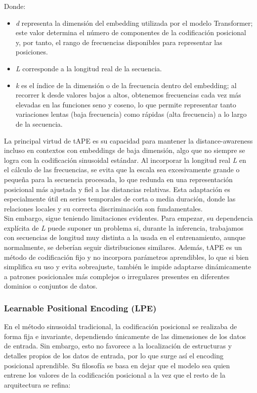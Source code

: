 Donde:

\begin{itemize}
	\item \textit{d} representa la dimensión del embedding utilizada por el modelo Transformer; este valor determina el número de componentes de la codificación posicional y, por tanto, el rango de frecuencias disponibles para representar las posiciones.
	\item \textit{L} corresponde a la longitud real de la secuencia.
	\item \textit{k} es el índice de la dimensión o de la frecuencia dentro del embedding; al recorrer k desde valores bajos a altos, obtenemos frecuencias cada vez más elevadas en las funciones seno y coseno, lo que permite representar tanto variaciones lentas (baja frecuencia) como rápidas (alta frecuencia) a lo largo de la secuencia.
\end{itemize} 

La principal virtud de tAPE es su capacidad para mantener la distance-awareness incluso en contextos con embeddings de baja dimensión, algo que no siempre se logra con la codificación sinusoidal estándar. Al incorporar la longitud real \textit{L} en el cálculo de las frecuencias, se evita que la escala sea excesivamente grande o pequeña para la secuencia procesada, lo que redunda en una representación posicional más ajustada y fiel a las distancias relativas. Esta adaptación es especialmente útil en series temporales de corta o media duración, donde las relaciones locales y su correcta discriminación son fundamentales.\\

Sin embargo, sigue teniendo limitaciones evidentes. Para empezar, su dependencia explícita de \textit{L} puede suponer un problema si, durante la inferencia, trabajamos con secuencias de longitud muy distinta a la usada en el entrenamiento, aunque normalmente, se deberían seguir distribuciones similares. Además, tAPE es un método de codificación fijo y no incorpora parámetros aprendibles, lo que si bien simplifica su uso y evita sobreajuste, también le impide adaptarse dinámicamente a patrones posicionales más complejos o irregulares presentes en diferentes dominios o conjuntos de datos.

\subsubsection{Learnable Positional Encoding (LPE)}

En el método sinusoidal tradicional, la codificación posicional se realizaba de forma fija e invariante, dependiendo únicamente de las dimensiones de los datos de entrada. Sin embargo, esto no favorece a la localización de estructuras y detalles propios de los datos de entrada, por lo que surge así el encoding posicional aprendible. Su filosofía se basa en dejar que el modelo sea quien entrene los valores de la codificación posicional a la vez que el resto de la arquitectura se refina:

